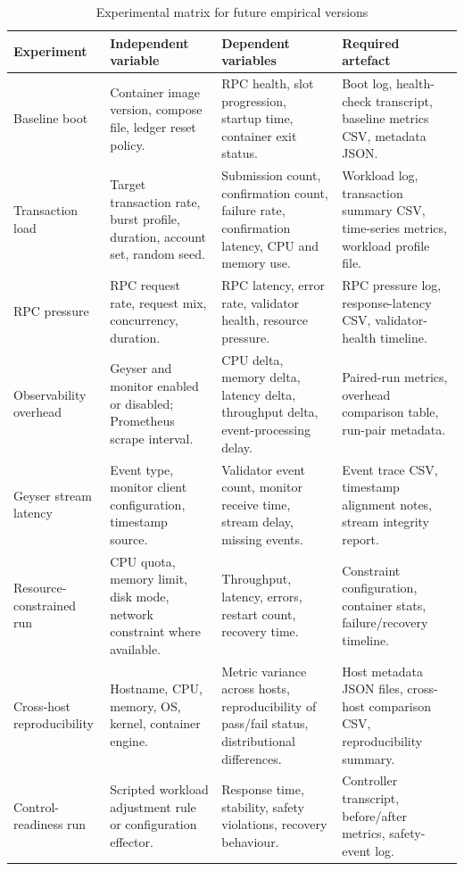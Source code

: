 \documentclass[11pt,a4paper]{article}
\begin{document}
\begin{table}[H]
\centering
\caption{Experimental matrix for future empirical versions}
\label{tab:experimental-matrix}
\begin{tabularx}{\textwidth}{L{2.7cm}Y Y Y}
\toprule
\textbf{Experiment} & \textbf{Independent variable} & \textbf{Dependent variables} & \textbf{Required artefact} \\
\midrule
Baseline boot & Container image version, compose file, ledger reset policy. & RPC health, slot progression, startup time, container exit status. & Boot log, health-check transcript, baseline metrics CSV, metadata JSON. \\
Transaction load & Target transaction rate, burst profile, duration, account set, random seed. & Submission count, confirmation count, failure rate, confirmation latency, CPU and memory use. & Workload log, transaction summary CSV, time-series metrics, workload profile file. \\
RPC pressure & RPC request rate, request mix, concurrency, duration. & RPC latency, error rate, validator health, resource pressure. & RPC pressure log, response-latency CSV, validator-health timeline. \\
Observability overhead & Geyser and monitor enabled or disabled; Prometheus scrape interval. & CPU delta, memory delta, latency delta, throughput delta, event-processing delay. & Paired-run metrics, overhead comparison table, run-pair metadata. \\
Geyser stream latency & Event type, monitor client configuration, timestamp source. & Validator event count, monitor receive time, stream delay, missing events. & Event trace CSV, timestamp alignment notes, stream integrity report. \\
Resource-constrained run & CPU quota, memory limit, disk mode, network constraint where available. & Throughput, latency, errors, restart count, recovery time. & Constraint configuration, container stats, failure/recovery timeline. \\
Cross-host reproducibility & Hostname, CPU, memory, OS, kernel, container engine. & Metric variance across hosts, reproducibility of pass/fail status, distributional differences. & Host metadata JSON files, cross-host comparison CSV, reproducibility summary. \\
Control-readiness run & Scripted workload adjustment rule or configuration effector. & Response time, stability, safety violations, recovery behaviour. & Controller transcript, before/after metrics, safety-event log. \\
\bottomrule
\end{tabularx}
\end{table}
\end{document}
